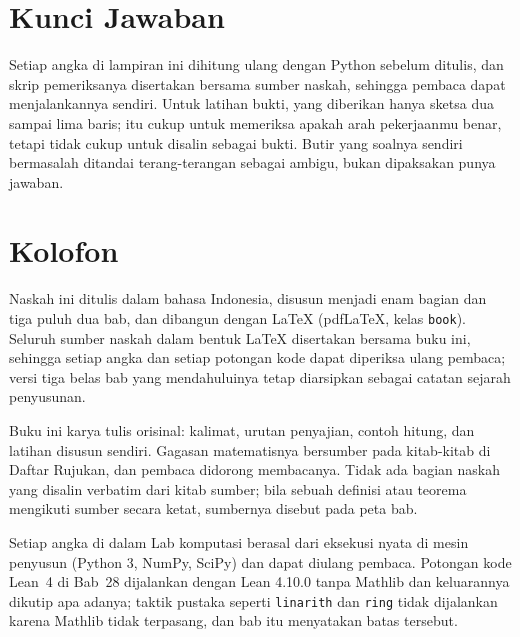 \documentclass[11pt,a4paper,oneside]{book}
\theoremstyle{definition}
\theoremstyle{plain}
\theoremstyle{remark}
\begin{document}
\chapter{Kunci Jawaban}
\label{app:kunci}

Setiap angka di lampiran ini dihitung ulang dengan Python sebelum ditulis, dan skrip
pemeriksanya disertakan bersama sumber naskah, sehingga pembaca dapat menjalankannya
sendiri. Untuk latihan bukti, yang diberikan hanya sketsa dua sampai lima baris;
itu cukup untuk memeriksa apakah arah pekerjaanmu benar, tetapi tidak cukup untuk
disalin sebagai bukti. Butir yang soalnya sendiri bermasalah ditandai terang-terangan
sebagai ambigu, bukan dipaksakan punya jawaban.






\cleardoublepage
{}
{}
\printindex

\chapter*{Kolofon}

Naskah ini ditulis dalam bahasa Indonesia, disusun menjadi enam bagian dan tiga puluh
dua bab, dan dibangun dengan \LaTeX{} (pdf\LaTeX{}, kelas \texttt{book}). Seluruh
sumber naskah dalam bentuk \LaTeX{} disertakan bersama buku ini, sehingga setiap angka
dan setiap potongan kode dapat diperiksa ulang pembaca; versi tiga belas bab yang
mendahuluinya tetap diarsipkan sebagai catatan sejarah penyusunan.

Buku ini karya tulis orisinal: kalimat, urutan penyajian, contoh hitung, dan latihan
disusun sendiri. Gagasan matematisnya bersumber pada kitab-kitab di Daftar Rujukan,
dan pembaca didorong membacanya. Tidak ada bagian naskah yang disalin verbatim dari
kitab sumber; bila sebuah definisi atau teorema mengikuti sumber secara ketat,
sumbernya disebut pada peta bab.

Setiap angka di dalam Lab komputasi berasal dari eksekusi nyata di mesin penyusun
(Python 3, NumPy, SciPy) dan dapat diulang pembaca. Potongan kode Lean~4 di Bab~28
dijalankan dengan Lean 4.10.0 tanpa Mathlib dan keluarannya dikutip apa adanya;
taktik pustaka seperti \texttt{linarith} dan \texttt{ring} tidak dijalankan karena
Mathlib tidak terpasang, dan bab itu menyatakan batas tersebut.
\end{document}
